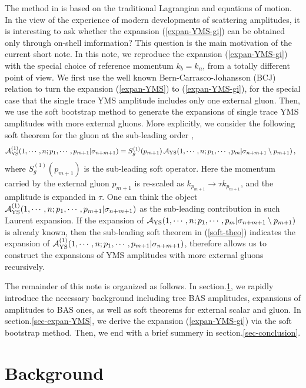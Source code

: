 \documentclass[11pt,a4paper]{article}
\newcommand{\bea}{\begin{eqnarray}}
\newcommand{\eea}{\end{eqnarray}}
\def\eref#1{(\ref{#1})}
\begin{document}
The method in \cite{Cheung:2021zvb} is based on the traditional Lagrangian and equations of motion. In the view of the experience of modern developments of scattering amplitudes, it is interesting to ask whether the expansion \eref{expan-YMS-gi} can be obtained only through on-shell imformation? This question is the main motivation of the current short note. In this note, we reproduce the expansion \eref{expan-YMS-gi} with the special choice of reference momentum $k_b=k_n$, from a totally different point of view. We first use the well known Bern-Carrasco-Johansson (BCJ) relation \cite{Bern:2008qj,Chiodaroli:2014xia,Johansson:2015oia,Johansson:2019dnu} to turn the expansion \eref{expan-YMS} to \eref{expan-YMS-gi}, for the special case that the single trace YMS amplitude includes only one external gluon. Then, we use the soft bootstrap method to generate the expansions of single trace YMS amplitudes with more external gluons. More explicitly, we consider the following soft theorem for the gluon at the sub-leading order \cite{Casali:2014xpa,Schwab:2014xua,Afkhami-Jeddi:2014fia},
%
\bea
{\cal A}^{(1)}_{\rm YS}(1,\cdots,n;p_1,\cdots,p_{m+1}|\sigma_{n+m+1})=S^{(1)}_g(p_{m+1})\,{\cal A}_{\rm YS}(1,\cdots,n;p_1,\cdots,p_m|\sigma_{n+m+1}\setminus p_{m+1})\,,~~\label{soft-theo}
\eea
%
where $S^{(1)}_g(p_{m+1})$ is the sub-leading soft operator. Here the momentum carried by the external gluon $p_{m+1}$
is re-scaled as $k_{p_{m+1}}\to\tau k_{p_{m+1}}$, and the amplitude is expanded in $\tau$. One can think the object ${\cal A}^{(1)}_{\rm YS}(1,\cdots,n;p_1,\cdots,p_{m+1}|\sigma_{n+m+1})$ as the sub-leading contribution in such Laurent expansion. If the expansion of
${\cal A}_{\rm YS}(1,\cdots,n;p_1,\cdots,p_m|\sigma_{n+m+1}\setminus p_{m+1})$ is already known, then the sub-leading soft theorem in \eref{soft-theo} indicates the expansion of ${\cal A}^{(1)}_{\rm YS}(1,\cdots,n;p_1,\cdots,p_{m+1}|\sigma_{n+m+1})$, therefore allows us to construct the expansions of YMS amplitudes with more external gluons recursively.

The remainder of this note is organized as follows. In section.\ref{sec-background}, we rapidly introduce the necessary background including tree BAS amplitudes, expansions of amplitudes to BAS ones, as well as soft theorems for external scalar and gluon. In section.\ref{sec-expan-YMS}, we derive the expansion \eref{expan-YMS-gi} via the soft bootstrap method. Then, we end with a brief summery in section.\ref{sec-conclusion}.

\section{Background}
\label{sec-background}
\end{document}
